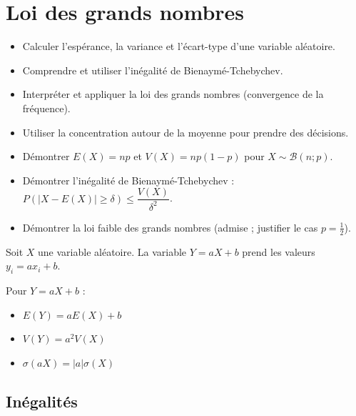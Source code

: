 \documentclass[11pt,a4paper,openany]{book}
\theoremstyle{definition}
\newcommand{\nchap}{
    \setcounter{Définition}{0}
    \setcounter{Propriété}{0}
    \setcounter{Théorème}{0}
    \setcounter{Remarque}{0}
    \setcounter{Exemple}{0}
}
\begin{document}
    \chapter{Loi des grands nombres}
    \nchap

    \begin{capacitesbox}
    \begin{itemize}
        \item Calculer l'espérance, la variance et l'écart-type d'une variable aléatoire.
        \item Comprendre et utiliser l'inégalité de Bienaymé-Tchebychev.
        \item Interpréter et appliquer la loi des grands nombres (convergence de la fréquence).
        \item Utiliser la concentration autour de la moyenne pour prendre des décisions.
    \end{itemize}
    \end{capacitesbox}

    \begin{demoprogbox}
    \begin{itemize}
        \item Démontrer $E(X)=np$ et $V(X)=np(1-p)$ pour $X\sim\mathcal{B}(n;p)$.
        \item Démontrer l'inégalité de Bienaymé-Tchebychev :
              $P(|X-E(X)|\geq\delta)\leq\dfrac{V(X)}{\delta^2}$.
        \item Démontrer la loi faible des grands nombres (admise ; justifier le cas $p=\frac{1}{2}$).
    \end{itemize}
    \end{demoprogbox}

    \begin{Définition}
        Soit $X$ une variable aléatoire. La variable $Y=aX+b$ prend les valeurs
        $y_i=ax_i+b$.
    \end{Définition}

    \begin{Propriété}
        Pour $Y=aX+b$ :
        \begin{itemize}
            \item $E(Y)=aE(X)+b$
            \item $V(Y)=a^2V(X)$
            \item $\sigma(aX)=|a|\sigma(X)$
        \end{itemize}
    \end{Propriété}

    \section{Inégalités}
\end{document}
